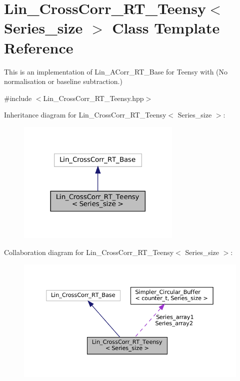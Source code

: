 \hypertarget{classLin__CrossCorr__RT__Teensy}{}\section{Lin\+\_\+\+Cross\+Corr\+\_\+\+R\+T\+\_\+\+Teensy$<$ Series\+\_\+size $>$ Class Template Reference}
\label{classLin__CrossCorr__RT__Teensy}


This is an implementation of Lin\+\_\+\+A\+Corr\+\_\+\+R\+T\+\_\+\+Base for Teensy with {\bfseries }(No normalisation or baseline subtraction.)  




{\ttfamily \#include $<$Lin\+\_\+\+Cross\+Corr\+\_\+\+R\+T\+\_\+\+Teensy.\+hpp$>$}



Inheritance diagram for Lin\+\_\+\+Cross\+Corr\+\_\+\+R\+T\+\_\+\+Teensy$<$ Series\+\_\+size $>$\+:\nopagebreak
\begin{figure}[H]
\begin{center}
\leavevmode
\includegraphics[width=222pt]{classLin__CrossCorr__RT__Teensy__inherit__graph}
\end{center}
\end{figure}


Collaboration diagram for Lin\+\_\+\+Cross\+Corr\+\_\+\+R\+T\+\_\+\+Teensy$<$ Series\+\_\+size $>$\+:\nopagebreak
\begin{figure}[H]
\begin{center}
\leavevmode
\includegraphics[width=350pt]{classLin__CrossCorr__RT__Teensy__coll__graph}
\end{center}
\end{figure}

